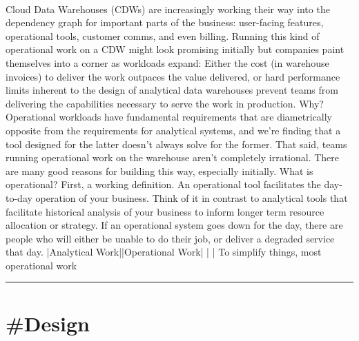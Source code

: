 \documentclass[10pt,a4paper]{article}
\begin{document}
\begin{multicols}{2}
\paragraph{}
Cloud Data Warehouses (CDWs) are increasingly working their way into the dependency graph for important parts of the business: user-facing features, operational tools, customer comms, and even billing. Running this kind of operational work on a CDW might look promising initially but companies paint themselves into a corner as workloads expand: Either the cost (in warehouse invoices) to deliver the work outpaces the value delivered, or hard performance limits inherent to the design of analytical data warehouses prevent teams from delivering the capabilities necessary to serve the work in production.
Why? Operational workloads have fundamental requirements that are diametrically opposite from the requirements for analytical systems, and we’re finding that a tool designed for the latter doesn’t always solve for the former. That said, teams running operational work on the warehouse aren’t completely irrational. There are many good reasons for building this way, especially initially.
What is operational?
First, a working definition. An operational tool facilitates the day-to-day operation of your business. Think of it in contrast to analytical tools that facilitate historical analysis of your business to inform longer term resource allocation or strategy. If an operational system goes down for the day, there are people who will either be unable to do their job, or deliver a degraded service that day.
|Analytical Work||Operational Work|
|
|
To simplify things, most operational work
\par\noindent\textcolor{red}{\rule{\linewidth}{0.2mm}}
\vfill
\null
\end{multicols}

\newpage
\section{\#Design}
\end{document}
